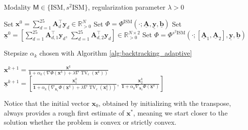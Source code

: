 \documentclass[letterpaper]{article}
\newcommand{\x}{\mathbf{x}}
\begin{document}
\begin{algorithm}
\caption{Mirror Descent with smoothed TV for ISM and $s^2$ISM}
\label{alg:Mirror-TV-Combined}
\begin{algorithmic}[1]

\Require Modality $\mathsf{M}\in\{\mathrm{ISM},s^2\mathrm{ISM}\}$, regularization parameter $\lambda>0$

    \State Set
$
    \mathbf{x}^0
    =
    \sum_{d=1}^{25}\mathbf A_d^\top\mathbf y_d
    \in
    \mathbb R^N_{>0}
$
    \State Set
$
    \Phi
    =
    \Phi^{\mathrm{ISM}}
    (\cdot;\underline{\mathbf A},\underline{\mathbf y},\underline{\mathbf b})
$
    \State Set
$
    \underline{\mathbf x}^0
    =
    \left[
    \sum_{d=1}^{25}\mathbf A_{d,1}^\top\mathbf y_d,\,
    \sum_{d=1}^{25}\mathbf A_{d,2}^\top\mathbf y_d
    \right]
    \in
    \mathbb R^{N\times2}_{>0}
$
    \State Set
$
    \Phi
    =
    \Phi^{s^2\mathrm{ISM}}
    (\cdot;[\underline{\mathbf A}_1,\underline{\mathbf A}_2],\underline{\mathbf y},\underline{\mathbf b})
$
\EndIf

\Require Stepsize $\alpha_k$ chosen with Algorithm \ref{alg:backtracking_adaptive}


        \State
 $
        \mathbf x^{k+1}
        =
        \frac{
        \mathbf x^k
        }{
        \mathbf 1
        +
        \alpha_k
        \left(
        \nabla\Phi(\mathbf x^k)
        +
        \lambda\nabla\operatorname{TV}_\epsilon(\mathbf x^k)
        \right)
        }
$
        \State
$
        \underline{\mathbf x}^{k+1}
        =
        \left[
        \frac{
        \mathbf x_1^k
        }{
        \mathbf 1
        +
        \alpha_k
        \left(
        \nabla_{\mathbf x_1}\Phi(\underline{\mathbf x}^k)
        +
        \lambda
        \nabla\operatorname{TV}_\epsilon(\mathbf x_1^k)
        \right)
        },
        \,
        \frac{
        \mathbf x_2^k
        }{
        \mathbf 1
        +
        \alpha_k
        \nabla_{\mathbf x_2}\Phi(\underline{\mathbf x}^k)
        }
        \right]
$
    \EndIf

\EndFor
\end{algorithmic}
\end{algorithm}

Notice that the initial vector $\x_0$, obtained by initializing with the transpose, always provides a rough first estimate of $\x^*$, meaning we start closer to the solution whether the problem is convex or strictly convex.
    
\end{document}
